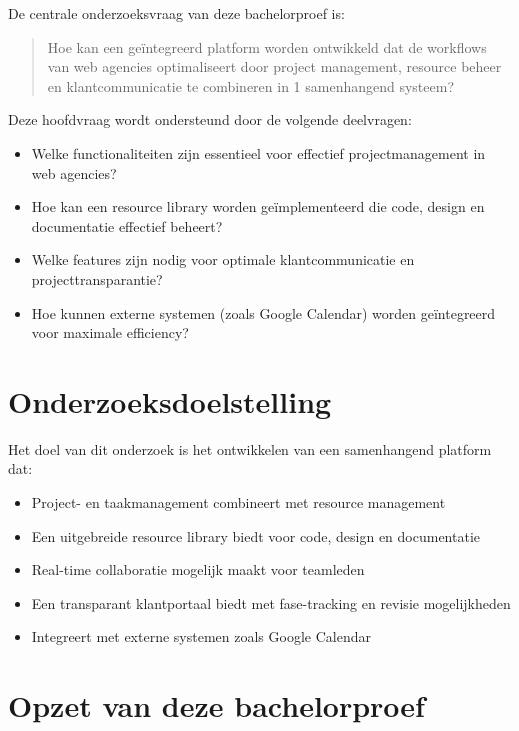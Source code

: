 De centrale onderzoeksvraag van deze bachelorproef is:

\begin{quote}
    Hoe kan een geïntegreerd platform worden ontwikkeld dat de workflows van web agencies optimaliseert door project management, resource beheer en klantcommunicatie te combineren in 1 samenhangend systeem?
\end{quote}

Deze hoofdvraag wordt ondersteund door de volgende deelvragen:

\begin{itemize}
    \item Welke functionaliteiten zijn essentieel voor effectief projectmanagement in web agencies?
    \item Hoe kan een resource library worden geïmplementeerd die code, design en documentatie effectief beheert?
    \item Welke features zijn nodig voor optimale klantcommunicatie en projecttransparantie?
    \item Hoe kunnen externe systemen (zoals Google Calendar) worden geïntegreerd voor maximale efficiency?
\end{itemize}

\section{Onderzoeksdoelstelling}
\label{sec:onderzoeksdoelstelling}

Het doel van dit onderzoek is het ontwikkelen van een samenhangend platform dat:

\begin{itemize}
    \item Project- en taakmanagement combineert met resource management
    \item Een uitgebreide resource library biedt voor code, design en documentatie
    \item Real-time collaboratie mogelijk maakt voor teamleden
    \item Een transparant klantportaal biedt met fase-tracking en revisie mogelijkheden
    \item Integreert met externe systemen zoals Google Calendar
\end{itemize}

\section{Opzet van deze bachelorproef}
\label{sec:opzet}

